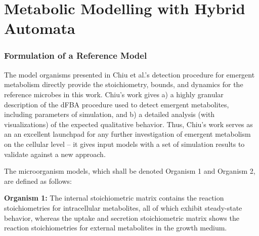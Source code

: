 \chapter{Metabolic Modelling with Hybrid Automata}\label{chap:model}

\subsection{Formulation of a Reference Model}

The model organisms presented in Chiu et al.'s detection procedure for emergent metabolism \cite{Chiu14} directly provide the stoichiometry, bounds, and dynamics for the reference microbes in this work. Chiu's work gives a) a highly granular description of the dFBA procedure used to detect emergent metabolites, including parameters of simulation, and b) a detailed analysis (with visualizations) of the expected qualitative behavior. Thus, Chiu's work serves as an an excellent launchpad for any further investigation of emergent metabolism on the cellular level -- it gives input models with a set of simulation results to validate against a new approach.

The microorganism models, which shall be denoted Organism 1 and Organism 2, are defined as follows:


\textbf{Organism 1:}
The internal stoichiometric matrix contains the reaction stoichiometries for intracellular metabolites, all of which exhibit steady-state behavior, whereas the uptake and secretion stoichiometric matrix shows the reaction stoichiometries for external metabolites in the growth medium.

